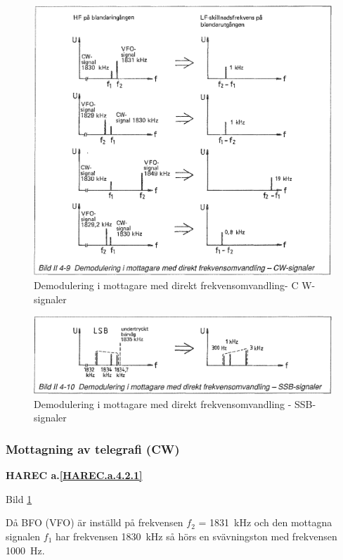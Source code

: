 \begin{figure}
  \includegraphics[width=\textwidth]{images/bild_2_4-09}
  \caption{Demodulering i mottagare med direkt frekvensomvandling- C W-signaler}
  \label{fig:bildII4-9}
\end{figure}

\begin{figure}
  \includegraphics[width=\textwidth]{images/bild_2_4-10}
  \caption{Demodulering i mottagare med direkt frekvensomvandling - SSB-signaler}
  \label{fig:bildII4-10}
\end{figure}

\subsubsection{Mottagning av telegrafi (CW)}
\textbf{HAREC a.\ref{HAREC.a.4.2.1}\label{myHAREC.a.4.2.1}}

Bild \ref{fig:bildII4-9}

Då BFO (VFO) är inställd på frekvensen \(f_2\) = 1831~kHz och den
mottagna signalen \(f_1\) har frekvensen 1830~kHz så hörs en
svävningston med frekvensen 1000~Hz.

